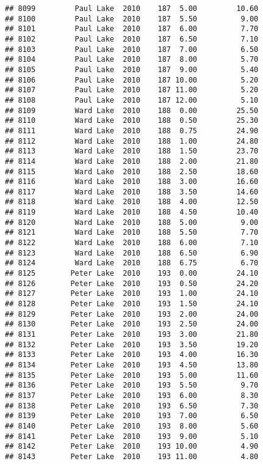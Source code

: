 \documentclass[
]{article}
\begin{document}
\begin{verbatim}
## 8099         Paul Lake  2010    187  5.00         10.60
## 8100         Paul Lake  2010    187  5.50          9.00
## 8101         Paul Lake  2010    187  6.00          7.70
## 8102         Paul Lake  2010    187  6.50          7.10
## 8103         Paul Lake  2010    187  7.00          6.50
## 8104         Paul Lake  2010    187  8.00          5.70
## 8105         Paul Lake  2010    187  9.00          5.40
## 8106         Paul Lake  2010    187 10.00          5.20
## 8107         Paul Lake  2010    187 11.00          5.20
## 8108         Paul Lake  2010    187 12.00          5.10
## 8109         Ward Lake  2010    188  0.00         25.50
## 8110         Ward Lake  2010    188  0.50         25.30
## 8111         Ward Lake  2010    188  0.75         24.90
## 8112         Ward Lake  2010    188  1.00         24.80
## 8113         Ward Lake  2010    188  1.50         23.70
## 8114         Ward Lake  2010    188  2.00         21.80
## 8115         Ward Lake  2010    188  2.50         18.60
## 8116         Ward Lake  2010    188  3.00         16.60
## 8117         Ward Lake  2010    188  3.50         14.60
## 8118         Ward Lake  2010    188  4.00         12.50
## 8119         Ward Lake  2010    188  4.50         10.40
## 8120         Ward Lake  2010    188  5.00          9.00
## 8121         Ward Lake  2010    188  5.50          7.70
## 8122         Ward Lake  2010    188  6.00          7.10
## 8123         Ward Lake  2010    188  6.50          6.90
## 8124         Ward Lake  2010    188  6.75          6.70
## 8125        Peter Lake  2010    193  0.00         24.10
## 8126        Peter Lake  2010    193  0.50         24.20
## 8127        Peter Lake  2010    193  1.00         24.10
## 8128        Peter Lake  2010    193  1.50         24.10
## 8129        Peter Lake  2010    193  2.00         24.00
## 8130        Peter Lake  2010    193  2.50         24.00
## 8131        Peter Lake  2010    193  3.00         21.80
## 8132        Peter Lake  2010    193  3.50         19.20
## 8133        Peter Lake  2010    193  4.00         16.30
## 8134        Peter Lake  2010    193  4.50         13.80
## 8135        Peter Lake  2010    193  5.00         11.60
## 8136        Peter Lake  2010    193  5.50          9.70
## 8137        Peter Lake  2010    193  6.00          8.30
## 8138        Peter Lake  2010    193  6.50          7.30
## 8139        Peter Lake  2010    193  7.00          6.50
## 8140        Peter Lake  2010    193  8.00          5.60
## 8141        Peter Lake  2010    193  9.00          5.10
## 8142        Peter Lake  2010    193 10.00          4.90
## 8143        Peter Lake  2010    193 11.00          4.80

\end{verbatim}
\end{document}

